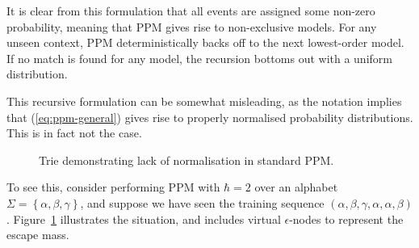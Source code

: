 \documentclass[12pt,a4paper,twoside,openright]{report}
\newcommand{\set}[1]{ \left\{ #1 \right\} }
\begin{document}
It is clear from this formulation that all events are assigned some non-zero
probability, meaning that PPM gives rise to non-exclusive models. For any unseen
context, PPM deterministically backs off to the next lowest-order model. If no
match is found for any model, the recursion bottoms out with a uniform
distribution. 

This recursive formulation can be somewhat misleading, as the notation implies
that (\ref{eq:ppm-general}) gives rise to properly normalised probability
distributions. This is in fact not the case. 

\vspace{4mm}
\begin{figure}[H]
\centering
{}
\caption{Trie demonstrating lack of normalisation in standard PPM.}
\label{fig:bad-ppm-trie}
\end{figure}

To see this, consider performing PPM with $\hbar = 2$ over an alphabet $\Sigma =
\set{\alpha,\beta,\gamma}$, and suppose we have seen the training sequence
$(\alpha,\beta,\gamma,\alpha,\alpha,\beta)$.  Figure~\ref{fig:bad-ppm-trie}
illustrates the situation, and includes virtual $\epsilon$-nodes to represent
the escape mass.
\end{document}
